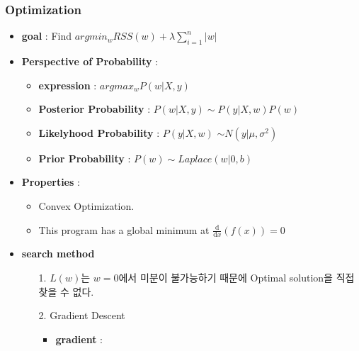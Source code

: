 \documentclass{article}
\begin{document}
\subsubsection{Optimization}
\begin{itemize}
    \item \textbf{goal} : Find $argmin_w RSS(w)+\lambda\sum_{i=1}^{n}{|w|}$
    \item \textbf{Perspective of Probability} : 
         \begin{itemize}
             \item \textbf{expression} : $argmax_w P(w|X,y)$
             \item \textbf{Posterior Probability} : $P(w|X,y) \sim P(y|X,w)P(w)$
             \item \textbf{Likelyhood Probability} : $P(y|X,w)$ $\sim N(y|\mu, {\sigma}^{2})$
             \item \textbf{Prior Probability} : $P(w) \sim Laplace(w|0, b)$
         \end{itemize}
    \item \textbf{Properties} : 
    \begin{itemize}
        \item Convex Optimization.
        \item This program has a global minimum at $\frac{\mathrm d}{\mathrm d x} \left( f(x) \right)=0$
    \end{itemize}
    \item \textbf{search method}
    \begin{itemize}
        \item[1.] $L(w)$는 $w=0$에서 미분이 불가능하기 때문에 Optimal solution을 직접 찾을 수 없다.
        \item[2.] Gradient Descent
        \begin{itemize}
            \item \textbf{gradient} : 
\end{itemize}
\end{itemize}
\end{itemize}
\end{document}
